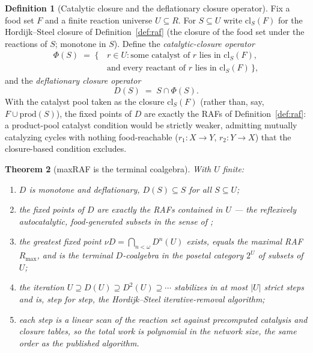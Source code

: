 \documentclass[11pt,a4paper]{article}
\theoremstyle{plain}
\newtheorem{theorem}{Theorem}[section]
\theoremstyle{definition}
\newtheorem{definition}[theorem]{Definition}
\theoremstyle{remark}
\begin{document}
\begin{definition}[Catalytic closure and the deflationary closure
operator]\label{def:deflationary}
Fix a food set $F$ and a finite reaction universe $U\subseteq R$.
For $S\subseteq U$ write $\mathrm{cl}_{S}(F)$ for the
Hordijk--Steel closure of Definition~\ref{def:raf} (the closure of
the food set under the reactions of $S$; monotone in $S$). Define
the \emph{catalytic-closure operator}
\begin{equation}\label{eq:Phi-def}
\begin{split}
  \Phi(S) \;=\; \{\, & r\in U : \text{some catalyst of } r \text{ lies in }
  \mathrm{cl}_{S}(F),\\
  & \text{and every reactant of } r \text{ lies in }
  \mathrm{cl}_{S}(F) \,\},
\end{split}
\end{equation}
and the \emph{deflationary closure operator}
\begin{equation}\label{eq:D-def}
  D(S) \;=\; S \cap \Phi(S).
\end{equation}
With the catalyst pool taken as the closure $\mathrm{cl}_{S}(F)$
(rather than, say, $F\cup\mathrm{prod}(S)$), the fixed points of $D$
are exactly the RAFs of Definition~\ref{def:raf}: a product-pool
catalyst condition would be strictly weaker, admitting mutually
catalyzing cycles with nothing food-reachable
($r_{1}:X\to Y$, $r_{2}:Y\to X$) that the closure-based condition
excludes.
\end{definition}

\begin{theorem}[maxRAF is the terminal coalgebra]
\label{thm:maxraf-terminal}
With $U$ finite:
\begin{enumerate}[leftmargin=*,itemsep=2pt]
\item[(i)] $D$ is monotone and deflationary, $D(S)\subseteq S$
  for all $S\subseteq U$;
\item[(ii)] the fixed points of $D$ are exactly the RAFs
  contained in $U$ --- the reflexively autocatalytic,
  food-generated subsets in the sense of
  \citealp{hordijk2011,steel2004};
\item[(iii)] the greatest fixed point
  $\nu D=\bigcap_{n<\omega}D^{n}(U)$ exists, equals the maximal
  RAF $R_{\max}$, and is the terminal $D$-coalgebra in the posetal
  category $2^{U}$ of subsets of $U$;
\item[(iv)] the iteration $U\supseteq D(U)\supseteq D^{2}(U)
  \supseteq\cdots$ stabilizes in at most $|U|$ strict steps and
  is, step for step, the Hordijk--Steel iterative-removal
  algorithm;
\item[(v)] each step is a linear scan of the reaction set against
  precomputed catalysis and closure tables, so the total work is
  polynomial in the network size, the same order as the published
  algorithm.
\end{enumerate}
\end{theorem}
\end{document}
